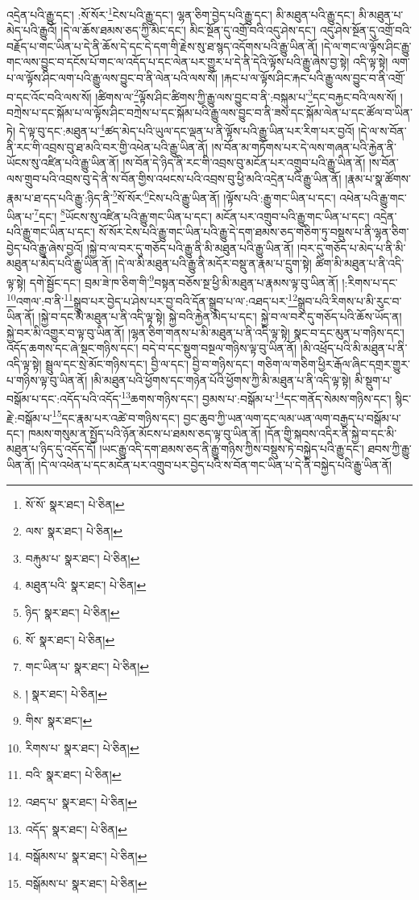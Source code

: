 འདྲེན་པའི་རྒྱུ་དང་། :སོ་སོར་\footnote{སོ་སོ་  སྣར་ཐང་།  པེ་ཅིན། }ངེས་པའི་རྒྱུ་དང་། ལྷན་ཅིག་བྱེད་པའི་རྒྱུ་དང་། མི་མཐུན་པའི་རྒྱུ་དང་། མི་མཐུན་པ་མེད་པའི་རྒྱུའོ། །དེ་ལ་ཆོས་ཐམས་ཅད་ཀྱི་མིང་དང་། མིང་སྔོན་དུ་འགྲོ་བའི་འདུ་ཤེས་དང་། འདུ་ཤེས་སྔོན་དུ་འགྲོ་བའི་བརྗོད་པ་གང་ཡིན་པ་དེ་ནི་ཆོས་དེ་དང་དེ་དག་གི་རྗེས་སུ་ཐ་སྙད་འདོགས་པའི་རྒྱུ་ཡིན་ནོ། །དེ་ལ་གང་ལ་ལྟོས་ཤིང་རྒྱུ་གང་ལས་བྱུང་བ་དངོས་པོ་གང་ལ་འདོད་པ་དང་ལེན་པར་གྱུར་པ་དེ་ནི་དེའི་ལྟོས་པའི་རྒྱུ་ཞེས་བྱ་སྟེ། འདི་ལྟ་སྟེ། ལག་པ་ལ་ལྟོས་ཤིང་ལག་པའི་རྒྱུ་ལས་བྱུང་བ་ནི་ལེན་པའི་ལས་སོ། །རྐང་པ་ལ་ལྟོས་ཤིང་རྐང་པའི་རྒྱུ་ལས་བྱུང་བ་ནི་འགྲོ་བ་དང་འོང་བའི་ལས་སོ། །ཚིགས་ལ་\footnote{ལས་  སྣར་ཐང་།  པེ་ཅིན། }ལྟོས་ཤིང་ཚིགས་ཀྱི་རྒྱུ་ལས་བྱུང་བ་ནི་:བསྐུམ་པ་\footnote{བརྐུམ་པ་  སྣར་ཐང་།  པེ་ཅིན། }དང་བརྐྱང་བའི་ལས་སོ། །བཀྲེས་པ་དང་སྐོམ་པ་ལ་ལྟོས་ཤིང་བཀྲེས་པ་དང་སྐོམ་པའི་རྒྱུ་ལས་བྱུང་བ་ནི་ཟས་དང་སྐོམ་ལེན་པ་དང་ཚོལ་བ་ཡིན་ཏེ། དེ་ལྟ་བུ་དང་:མཐུན་པ་\footnote{མཐུན་པའི་  སྣར་ཐང་།  པེ་ཅིན། }ཚད་མེད་པའི་ཡུལ་དང་ལྡན་པ་ནི་ལྟོས་པའི་རྒྱུ་ཡིན་པར་རིག་པར་བྱའོ། །དེ་ལ་ས་བོན་ནི་རང་གི་འབྲས་བུ་ཐ་མའི་བར་གྱི་འཕེན་པའི་རྒྱུ་ཡིན་ནོ། །ས་བོན་མ་གཏོགས་པར་དེ་ལས་གཞན་པའི་རྐྱེན་ནི་ཡོངས་སུ་འཛིན་པའི་རྒྱུ་ཡིན་ནོ། །ས་བོན་དེ་ཉིད་ནི་རང་གི་འབྲས་བུ་མངོན་པར་འགྲུབ་པའི་རྒྱུ་ཡིན་ནོ། །ས་བོན་ལས་གྲུབ་པའི་འབྲས་བུ་དེ་ནི་ས་བོན་གྱིས་འཕངས་པའི་འབྲས་བུ་ཕྱི་མའི་འདྲེན་པའི་རྒྱུ་ཡིན་ནོ། །རྣམ་པ་སྣ་ཚོགས་རྣམ་པ་ཐ་དད་པའི་རྒྱུ་:ཉིད་ནི་\footnote{ཉིད་  སྣར་ཐང་།  པེ་ཅིན། }སོ་སོར་\footnote{སོ་  སྣར་ཐང་།  པེ་ཅིན། }ངེས་པའི་རྒྱུ་ཡིན་ནོ། །ལྟོས་པའི་:རྒྱུ་གང་ཡིན་པ་དང་། འཕེན་པའི་རྒྱུ་གང་ཡིན་པ་\footnote{གང་ཡིན་པ་  སྣར་ཐང་།  པེ་ཅིན། }དང་། \footnote{།    སྣར་ཐང་།  པེ་ཅིན། }ཡོངས་སུ་འཛིན་པའི་རྒྱུ་གང་ཡིན་པ་དང་། མངོན་པར་འགྲུབ་པའི་རྒྱུ་གང་ཡིན་པ་དང་། འདྲེན་པའི་རྒྱུ་གང་ཡིན་པ་དང་། སོ་སོར་ངེས་པའི་རྒྱུ་གང་ཡིན་པའི་རྒྱུ་དེ་དག་ཐམས་ཅད་གཅིག་ཏུ་བསྡུས་པ་ནི་ལྷན་ཅིག་བྱེད་པའི་རྒྱུ་ཞེས་བྱའོ། །སྐྱེ་བ་ལ་བར་དུ་གཅོད་པའི་རྒྱུ་ནི་མི་མཐུན་པའི་རྒྱུ་ཡིན་ནོ། །བར་དུ་གཅོད་པ་མེད་པ་ནི་མི་མཐུན་པ་མེད་པའི་རྒྱུ་ཡིན་ནོ། །དེ་ལ་མི་མཐུན་པའི་རྒྱུ་ནི་མདོར་བསྡུ་ན་རྣམ་པ་དྲུག་སྟེ། ཚིག་མི་མཐུན་པ་ནི་འདི་ལྟ་སྟེ། དགེ་སྦྱོང་དང་། བྲམ་ཟེ་ཁ་ཅིག་གི་\footnote{གིས་  སྣར་ཐང་། }བསྟན་བཅོས་སྔ་ཕྱི་མི་མཐུན་པ་རྣམས་ལྟ་བུ་ཡིན་ནོ། །:རིགས་པ་དང་\footnote{རིགས་པ་  སྣར་ཐང་།  པེ་ཅིན། }འགལ་:བ་ནི་\footnote{བའི་  སྣར་ཐང་།  པེ་ཅིན། }སྒྲུབ་པར་བྱེད་པ་ཤེས་པར་བྱ་བའི་དོན་སྒྲུབ་པ་ལ་:འཐད་པར་\footnote{འཐད་པ་  སྣར་ཐང་།  པེ་ཅིན། }སྒྲུབ་པའི་རིགས་པ་མི་རུང་བ་ཡིན་ནོ། །སྐྱེ་བ་དང་མི་མཐུན་པ་ནི་འདི་ལྟ་སྟེ། སྐྱེ་བའི་རྐྱེན་མེད་པ་དང་། སྐྱེ་བ་ལ་བར་དུ་གཅོད་པའི་ཆོས་ཡོད་ན། སྐྱེ་བར་མི་འགྱུར་བ་ལྟ་བུ་ཡིན་ནོ། །ལྷན་ཅིག་གནས་པ་མི་མཐུན་པ་ནི་འདི་ལྟ་སྟེ། སྣང་བ་དང་མུན་པ་གཉིས་དང་། འདོད་ཆགས་དང་ཞེ་སྡང་གཉིས་དང་། བདེ་བ་དང་སྡུག་བསྔལ་གཉིས་ལྟ་བུ་ཡིན་ནོ། །མི་འཕྲོད་པའི་མི་མཐུན་པ་ནི་འདི་ལྟ་སྟེ། སྦྲུལ་དང་སྲེ་མོང་གཉིས་དང་། བྱི་ལ་དང་། བྱི་བ་གཉིས་དང་། གཅིག་ལ་གཅིག་ཕྱིར་རྒོལ་ཞིང་དགྲར་གྱུར་པ་གཉིས་ལྟ་བུ་ཡིན་ནོ། །མི་མཐུན་པའི་ཕྱོགས་དང་གཉེན་པོའི་ཕྱོགས་ཀྱི་མི་མཐུན་པ་ནི་འདི་ལྟ་སྟེ། མི་སྡུག་པ་བསྒོམ་པ་དང་:འདོད་པའི་འདོད་\footnote{འདོད་  སྣར་ཐང་།  པེ་ཅིན། }ཆགས་གཉིས་དང་། བྱམས་པ་:བསྒོམ་པ་\footnote{བསྒོམས་པ་  སྣར་ཐང་།  པེ་ཅིན། }དང་གནོད་སེམས་གཉིས་དང་། སྙིང་རྗེ་:བསྒོམ་པ་\footnote{བསྒོམས་པ་  སྣར་ཐང་།  པེ་ཅིན། }དང་རྣམ་པར་འཚེ་བ་གཉིས་དང་། བྱང་ཆུབ་ཀྱི་ཡན་ལག་དང་ལམ་ཡན་ལག་བརྒྱད་པ་བསྒོམ་པ་དང་། ཁམས་གསུམ་ན་སྤྱོད་པའི་ཉོན་མོངས་པ་ཐམས་ཅད་ལྟ་བུ་ཡིན་ནོ། །དོན་གྱི་སྐབས་འདིར་ནི་སྐྱེ་བ་དང་མི་མཐུན་པ་ཉིད་དུ་འདོད་དོ། །ཡང་རྒྱུ་འདི་དག་ཐམས་ཅད་ནི་རྒྱུ་གཉིས་ཀྱིས་བསྡུས་ཏེ་བསྐྱེད་པའི་རྒྱུ་དང་། ཐབས་ཀྱི་རྒྱུ་ཡིན་ནོ། །དེ་ལ་འཕེན་པ་དང་མངོན་པར་འགྲུབ་པར་བྱེད་པའི་ས་བོན་གང་ཡིན་པ་དེ་ནི་བསྐྱེད་པའི་རྒྱུ་ཡིན་ནོ། 